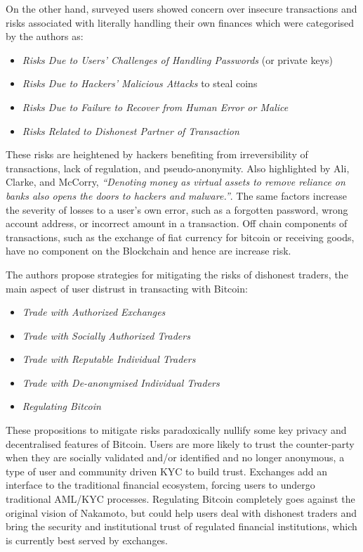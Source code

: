 \documentclass[12pt]{article} %
\begin{document}
On the other hand, surveyed users showed concern over insecure transactions and risks associated with literally handling their own finances which were categorised by the authors as:
\begin{itemize}
	\item \textit{Risks Due to Users' Challenges of Handling Passwords} (or private keys)
	\item \textit{Risks Due to Hackers' Malicious Attacks} to steal coins
	\item \textit{Risks Due to Failure to Recover from Human Error or Malice}
	\item \textit{Risks Related to Dishonest Partner of Transaction}
\end{itemize}
These risks are heightened by hackers benefiting from irreversibility of transactions, lack of regulation, and pseudo-anonymity. Also highlighted by Ali, Clarke, and McCorry, \textit{``Denoting money as virtual assets to remove reliance on banks also opens the doors to hackers and malware.''}\cite{Ali:2015:BPU:2990603.2990632}. The same factors increase the severity of losses to a user's own error, such as a forgotten password, wrong account address, or incorrect amount in a transaction. Off chain components of transactions, such as the exchange of fiat currency for bitcoin or receiving goods, have no component on the Blockchain and hence are increase risk.

The authors propose strategies for mitigating the risks of dishonest traders, the main aspect of user distrust in transacting with Bitcoin: 
\begin{itemize}
	\item \textit{Trade with Authorized Exchanges}
	\item \textit{Trade with Socially Authorized Traders}
	\item \textit{Trade with Reputable Individual Traders}
	\item \textit{Trade with De-anonymised Individual Traders}
	\item \textit{Regulating Bitcoin}
\end{itemize}
These propositions to mitigate risks paradoxically nullify some key privacy and decentralised features of Bitcoin. Users are more likely to trust the counter-party when they are socially validated and/or identified and no longer anonymous, a type of user and community driven KYC to build trust. Exchanges add an interface to the traditional financial ecosystem, forcing users to undergo traditional AML/KYC processes. Regulating Bitcoin completely goes against the original vision of Nakamoto, but could help users deal with dishonest traders and bring the security and institutional trust of regulated financial institutions, which is currently best served by exchanges.
\end{document}
